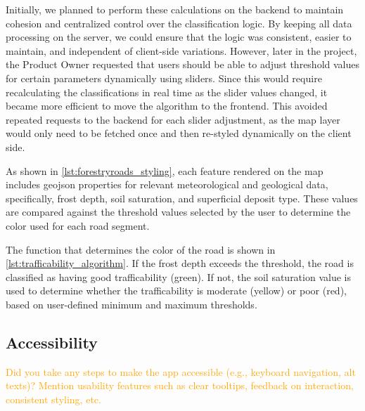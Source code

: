 Initially, we planned to perform these calculations on the backend to maintain cohesion and centralized control over the classification logic. By keeping all data processing on the server, we could ensure that the logic was consistent, easier to maintain, and independent of client-side variations. However, later in the project, the Product Owner requested that users should be able to adjust threshold values for certain parameters dynamically using sliders. Since this would require recalculating the classifications in real time as the slider values changed, it became more efficient to move the algorithm to the frontend. This avoided repeated requests to the backend for each slider adjustment, as the map layer would only need to be fetched once and then re-styled dynamically on the client side.

As shown in \autoref{lst:forestryroads_styling}, each feature rendered on the map includes \gls{geojson} properties for relevant meteorological and geological data, specifically, frost depth, soil saturation, and superficial deposit type. These values are compared against the threshold values selected by the user to determine the color used for each road segment.

The function that determines the color of the road is shown in \autoref{lst:trafficability_algorithm}. If the frost depth exceeds the threshold, the road is classified as having good trafficability (green). If not, the soil saturation value is used to determine whether the trafficability is moderate (yellow) or poor (red), based on user-defined minimum and maximum thresholds.

\begin{figure}[h]

\end{figure}

\begin{figure}[h]

\end{figure}

\subsection{Accessibility}

\textcolor{orange}{Did you take any steps to make the app accessible (e.g., keyboard navigation, alt texts)?
Mention usability features such as clear tooltips, feedback on interaction, consistent styling, etc.}

